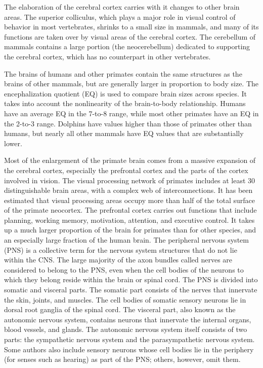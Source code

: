 The elaboration of the cerebral cortex carries with it changes to other brain areas. The superior colliculus, which plays a major role in visual control of behavior in most vertebrates, shrinks to a small size in mammals, and many of its functions are taken over by visual areas of the cerebral cortex. The cerebellum of mammals contains a large portion (the neocerebellum) dedicated to supporting the cerebral cortex, which has no counterpart in other vertebrates.

The brains of humans and other primates contain the same structures as the brains of other mammals, but are generally larger in proportion to body size. The encephalization quotient (EQ) is used to compare brain sizes across species. It takes into account the nonlinearity of the brain-to-body relationship. Humans have an average EQ in the 7-to-8 range, while most other primates have an EQ in the 2-to-3 range. Dolphins have values higher than those of primates other than humans, but nearly all other mammals have EQ values that are substantially lower.

Most of the enlargement of the primate brain comes from a massive expansion of the cerebral cortex, especially the prefrontal cortex and the parts of the cortex involved in vision. The visual processing network of primates includes at least 30 distinguishable brain areas, with a complex web of interconnections. It has been estimated that visual processing areas occupy more than half of the total surface of the primate neocortex. The prefrontal cortex carries out functions that include planning, working memory, motivation, attention, and executive control. It takes up a much larger proportion of the brain for primates than for other species, and an especially large fraction of the human brain.
The peripheral nervous system (PNS) is a collective term for the nervous system structures that do not lie within the CNS. The large majority of the axon bundles called nerves are considered to belong to the PNS, even when the cell bodies of the neurons to which they belong reside within the brain or spinal cord. The PNS is divided into somatic and visceral parts. The somatic part consists of the nerves that innervate the skin, joints, and muscles. The cell bodies of somatic sensory neurons lie in dorsal root ganglia of the spinal cord. The visceral part, also known as the autonomic nervous system, contains neurons that innervate the internal organs, blood vessels, and glands. The autonomic nervous system itself consists of two parts: the sympathetic nervous system and the parasympathetic nervous system. Some authors also include sensory neurons whose cell bodies lie in the periphery (for senses such as hearing) as part of the PNS; others, however, omit them.

